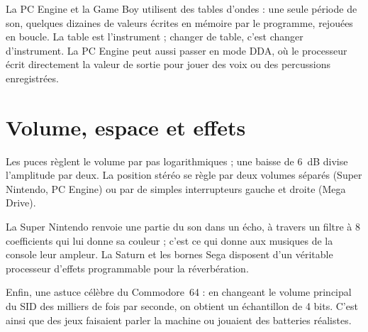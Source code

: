 La PC Engine et la Game Boy utilisent des tables d'ondes : une seule période de son, quelques dizaines de valeurs
écrites en mémoire par le programme, rejouées en boucle. La table est l'instrument ; changer de table, c'est changer
d'instrument. La PC Engine peut aussi passer en mode DDA, où le processeur écrit directement la valeur de sortie pour
jouer des voix ou des percussions enregistrées.

\section{Volume, espace et effets}
Les puces règlent le volume par pas logarithmiques ; une baisse de 6~dB divise l'amplitude par deux. La position
stéréo se règle par deux volumes séparés (Super Nintendo, PC Engine) ou par de simples interrupteurs gauche et droite
(Mega Drive).

La Super Nintendo renvoie une partie du son dans un écho, à travers un filtre à 8 coefficients qui lui donne sa
couleur ; c'est ce qui donne aux musiques de la console leur ampleur. La Saturn et les bornes Sega disposent d'un
véritable processeur d'effets programmable pour la réverbération.

Enfin, une astuce célèbre du Commodore~64 : en changeant le volume principal du SID des milliers de fois par seconde,
on obtient un échantillon de 4 bits. C'est ainsi que des jeux faisaient parler la machine ou jouaient des batteries
réalistes.
